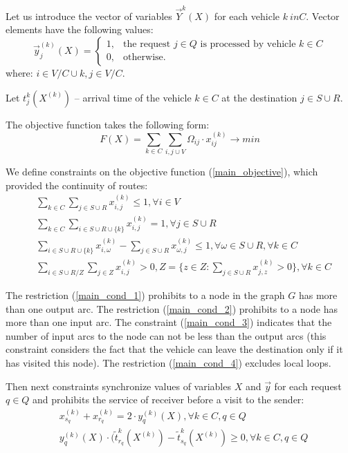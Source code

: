 \documentclass[]{TAACpaper}
\begin{document}
Let us introduce the vector  of variables $ \vec{Y}  ^ k(X) $ for each vehicle $ k \ in C $. Vector elements have the following values:
\begin{equation}
\vec{y}^{(k)}_{j}(X) = 
\begin{cases}
1,&\text{the request $j \in Q$ is processed by vehicle $k \in C$}\\
0,&\text{otherwise.}
\end{cases}
\end{equation}
where: $i\in{V/C \cup {k}}, j \in V/C$.


Let $t^k_j(X^{(k)})$ -- arrival time of the vehicle $k \in C$ at the destination $j \in S \cup R$. 

The objective function takes the following form:
\begin{equation} \label{main_objective}
  F(X) = 
    \sum_{k \in C}
     \sum_{i,j\cup{V}} 
     \Omega_{ij} \cdot x_{ij}^{(k)} 
     \to min
\end{equation}

We define constraints on the objective function (\ref{main_objective}), which provided the continuity of routes:
\begin{align} 
& \sum_{k \in C}\sum_{j \in S \cup R}x^{(k)}_{i,j} \leq 1, 
\forall i \in V \label{main_cond_1}\\
& \sum_{k \in C}\sum_{i \in S \cup R \cup \{k\} } x^{(k)}_{i,j} = 1, 
\forall j \in S \cup R \label{main_cond_2}\\
& \sum_{i \in S \cup R \cup \{k\} } x^{(k)}_{i,\omega} - 
\sum_{j \in S \cup R} x^{(k)}_{\omega,j} \leq 1, 
\forall \omega \in S \cup R,  \forall k \in C \label{main_cond_3}\\
&  \sum_{i \in S \cup R / Z}\sum_{j \in Z } x^{(k)}_{i,j} > 0, 
Z=\{z \in Z: \sum_{j \in S \cup R}x^{(k)}_{j,z}>0 \}  ,\forall k \in C \label{main_cond_4}
\end{align}

The restriction (\ref{main_cond_1}) prohibits to a node in the graph $G$ has more than one output arc. The restriction (\ref{main_cond_2}) prohibits to a node has more than one input arc.  The constraint (\ref{main_cond_3}) indicates that the number of input arcs to the node can not be less than the output arcs (this constraint considers the fact that the vehicle can leave the destination only if it has visited this node). The restriction (\ref{main_cond_4}) excludes local loops.

Then next constraints synchronize values of variables $X$ and $\vec{y}$ for each request $q \in Q$ and prohibits the service of receiver before a visit to the sender:
\begin{align} 
& x^{(k)}_{s_q} + x^{(k)}_{r_q} = 2 \cdot y^{(k)}_{q}(X), \forall k \in C, q \in Q  \\
& y^{(k)}_{q}(X) \cdot (\tilde{t}^k_{r_q}(X^{(k)})-\tilde{t}^k_{s_q}(X^{(k)})\ge{0}, \forall k \in C, q \in Q
\end{align}
\end{document}
